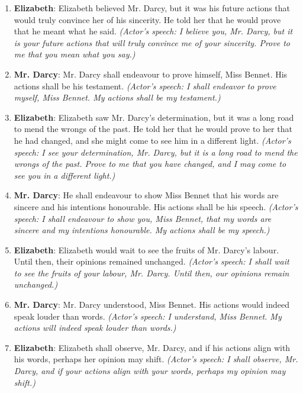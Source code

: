 \documentclass[10pt]{article}
\begin{document}
\begin{enumerate}
\item \textbf{Elizabeth}: Elizabeth believed Mr. Darcy, but it was his future actions that would truly convince her of his sincerity. He told her that he would prove that he meant what he said. \emph{(Actor's speech: I believe you, Mr. Darcy, but it is your future actions that will truly convince me of your sincerity. Prove to me that you mean what you say.)}

\item \textbf{Mr. Darcy}: Mr. Darcy shall endeavour to prove himself, Miss Bennet. His actions shall be his testament. \emph{(Actor's speech: I shall endeavor to prove myself, Miss Bennet. My actions shall be my testament.)}

\item \textbf{Elizabeth}: Elizabeth saw Mr. Darcy's determination, but it was a long road to mend the wrongs of the past. He told her that he would prove to her that he had changed, and she might come to see him in a different light. \emph{(Actor's speech: I see your determination, Mr. Darcy, but it is a long road to mend the wrongs of the past. Prove to me that you have changed, and I may come to see you in a different light.)}

\item \textbf{Mr. Darcy}: He shall endeavour to show Miss Bennet that his words are sincere and his intentions honourable. His actions shall be his speech. \emph{(Actor's speech: I shall endeavour to show you, Miss Bennet, that my words are sincere and my intentions honourable. My actions shall be my speech.)}

\item \textbf{Elizabeth}: Elizabeth would wait to see the fruits of Mr. Darcy's labour. Until then, their opinions remained unchanged. \emph{(Actor's speech: I shall wait to see the fruits of your labour, Mr. Darcy. Until then, our opinions remain unchanged.)}

\item \textbf{Mr. Darcy}: Mr. Darcy understood, Miss Bennet. His actions would indeed speak louder than words. \emph{(Actor's speech: I understand, Miss Bennet. My actions will indeed speak louder than words.)}

\item \textbf{Elizabeth}: Elizabeth shall observe, Mr. Darcy, and if his actions align with his words, perhaps her opinion may shift. \emph{(Actor's speech: I shall observe, Mr. Darcy, and if your actions align with your words, perhaps my opinion may shift.)}


\end{enumerate}
\end{document}
